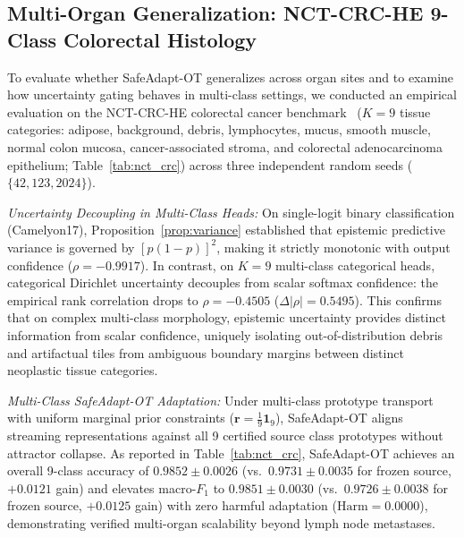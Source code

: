 \documentclass[journal]{IEEEtran}
\begin{document}
\subsection{Multi-Organ Generalization: NCT-CRC-HE 9-Class Colorectal Histology}
\label{sec:nct_crc}
To evaluate whether SafeAdapt-OT generalizes across organ sites and to examine how uncertainty gating behaves in multi-class settings, we conducted an empirical evaluation on the NCT-CRC-HE colorectal cancer benchmark~\cite{kather2019nctcrc} ($K=9$ tissue categories: adipose, background, debris, lymphocytes, mucus, smooth muscle, normal colon mucosa, cancer-associated stroma, and colorectal adenocarcinoma epithelium; Table~\ref{tab:nct_crc}) across three independent random seeds ($\{42, 123, 2024\}$).

\textit{Uncertainty Decoupling in Multi-Class Heads:} On single-logit binary classification (Camelyon17), Proposition~\ref{prop:variance} established that epistemic predictive variance is governed by $[p(1-p)]^2$, making it strictly monotonic with output confidence ($\rho = -0.9917$). In contrast, on $K=9$ multi-class categorical heads, categorical Dirichlet uncertainty decouples from scalar softmax confidence: the empirical rank correlation drops to $\rho = -0.4505$ ($\Delta |\rho| = 0.5495$). This confirms that on complex multi-class morphology, epistemic uncertainty provides distinct information from scalar confidence, uniquely isolating out-of-distribution debris and artifactual tiles from ambiguous boundary margins between distinct neoplastic tissue categories.

\textit{Multi-Class SafeAdapt-OT Adaptation:} Under multi-class prototype transport with uniform marginal prior constraints ($\mathbf{r} = \frac{1}{9}\mathbf{1}_9$), SafeAdapt-OT aligns streaming representations against all 9 certified source class prototypes without attractor collapse. As reported in Table~\ref{tab:nct_crc}, SafeAdapt-OT achieves an overall 9-class accuracy of $\mathbf{0.9852} \pm 0.0026$ (vs.\ $0.9731 \pm 0.0035$ for frozen source, $+0.0121$ gain) and elevates macro-$F_1$ to $\mathbf{0.9851} \pm 0.0030$ (vs.\ $0.9726 \pm 0.0038$ for frozen source, $+0.0125$ gain) with zero harmful adaptation ($\mathrm{Harm} = 0.0000$), demonstrating verified multi-organ scalability beyond lymph node metastases.
\end{document}
